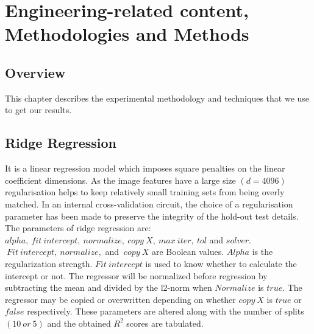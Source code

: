 \chapter{Engineering-related content, Methodologies and Methods}

\section{Overview}
This chapter describes the experimental methodology and techniques that we use to get our results.


\section{Ridge Regression}
It is a linear regression model which imposes square penalties on the linear coefficient dimensions. As the image features have a large size $(d=4096)$ regularisation helps to keep relatively small training sets from being overly matched. In an internal cross-validation circuit, the choice of a regularisation parameter has been made to preserve the integrity of the hold-out test details.
The parameters of ridge regression are: \(alpha, ~fit~intercept, ~normalize, ~copy~X, ~max~iter,~tol\) and \(solver\). \(~Fit~intercept, ~normalize,\) and \(~copy~X\) are Boolean values. \(Alpha\) is the regularization strength. \(Fit~intercept\) is used to know whether to calculate the intercept or not. The regressor will be normalized before regression by subtracting the mean and divided by the l2-norm when \(Normalize\) is \(true\). The regressor may be copied or overwritten depending on whether \(copy~X\) is \(true\) or \(false\) respectively. These parameters are altered along with the number of splits $(10~or~5)$ and the obtained \(R^2\) scores are tabulated.

